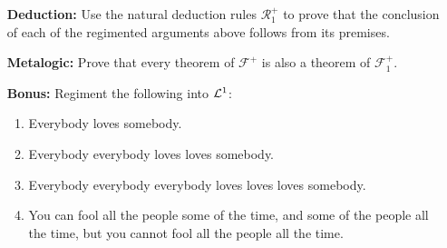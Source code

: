 \documentclass[a4paper, 11pt]{article} %
\begin{document}
\begin{enumerate}[leftmargin=1.2in]
\begin{enumerate}[label=(\arabic*)]
	      \end{enumerate}
	\item[\bf Deduction:] Use the natural deduction rules $\mathcal{R}_1^+$ to prove that the conclusion of each of the regimented arguments above follows from its premises.
	\item[\bf Metalogic:] Prove that every theorem of $\mathcal{F}^+$ is also a theorem of $\mathcal{F}^+_1$.
	\item[\bf Bonus:] Regiment the following into $\mathcal{L}^1$:
	      \begin{enumerate}[label=(\arabic*)]\small
		      \item Everybody loves somebody.
		      \item Everybody everybody loves loves somebody.
		      \item Everybody everybody everybody loves loves loves somebody.
		      \item You can fool all the people some of the time, and some of the people all the time, but you cannot fool all the people all the time.
	      \end{enumerate}
\end{enumerate}
\end{document}
